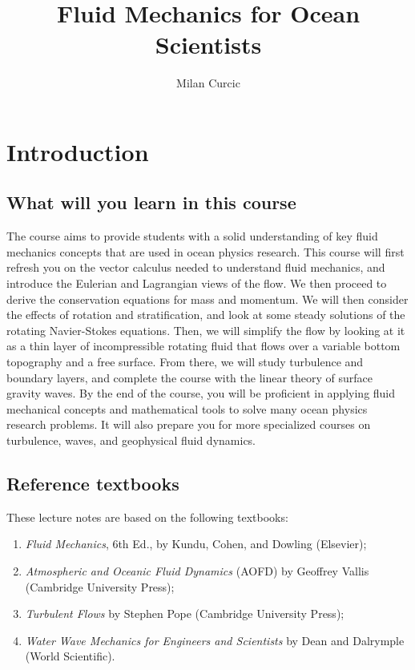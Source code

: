 \documentclass[12pt]{article}
\numberwithin{equation}{section}
\numberwithin{figure}{section}
\numberwithin{table}{section}
\begin{document}
\title{Fluid Mechanics for Ocean Scientists}
\author{Milan Curcic}
\date{}

\maketitle

\tableofcontents

\newpage
\section{Introduction}

\subsection{What will you learn in this course}

The course aims to provide students with a solid understanding of key fluid
mechanics concepts that are used in ocean physics research.
This course will first refresh you on the vector calculus needed to understand
fluid mechanics, and introduce the Eulerian and Lagrangian views of the flow.
We then proceed to derive the conservation equations for mass and momentum.
We will then consider the effects of rotation and stratification, and look
at some steady solutions of the rotating Navier-Stokes equations.
Then, we will simplify the flow by looking at it as a thin layer of
incompressible rotating fluid that flows over a variable bottom topography
and a free surface.
From there, we will study turbulence and boundary layers, and complete the
course with the linear theory of surface gravity waves.
By the end of the course, you will be proficient in applying fluid mechanical
concepts and mathematical tools to solve many ocean physics research problems.
It will also prepare you for more specialized courses on turbulence, waves,
and geophysical fluid dynamics.

\subsection{Reference textbooks}

These lecture notes are based on the following textbooks:

\begin{enumerate}
  \item \textit{Fluid Mechanics}, 6th Ed., by Kundu, Cohen, and Dowling (Elsevier);
  \item \textit{Atmospheric and Oceanic Fluid Dynamics} (AOFD) by Geoffrey Vallis (Cambridge University Press);
  \item \textit{Turbulent Flows} by Stephen Pope (Cambridge University Press);
  \item \textit{Water Wave Mechanics for Engineers and Scientists} by Dean and Dalrymple (World Scientific).
\end{enumerate}
\end{document}
